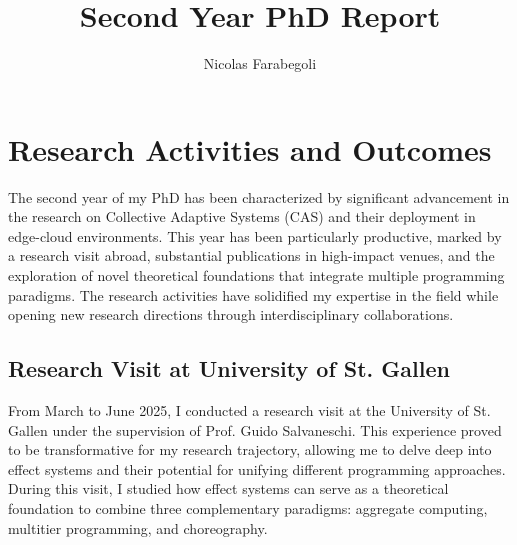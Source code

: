 \documentclass[runningheads]{llncs}
\begin{document}
%
\title{Second Year PhD Report}
%
%
\author{Nicolas Farabegoli}%
%
%
%
\maketitle              %
%

%
%
%
\section{Research Activities and Outcomes}
The second year of my PhD has been characterized by significant advancement in the research on Collective Adaptive Systems (CAS) and their deployment in edge-cloud environments.
%
This year has been particularly productive,
marked by a research visit abroad,
substantial publications in high-impact venues,
and the exploration of novel theoretical foundations that integrate multiple programming paradigms.
%
The research activities have solidified my expertise in the field while opening new research directions through interdisciplinary collaborations.

\subsection{Research Visit at University of St. Gallen}

From March to June 2025,
I conducted a research visit at the University of St. Gallen under the supervision of Prof. Guido Salvaneschi.
%
This experience proved to be transformative for my research trajectory,
allowing me to delve deep into effect systems and their potential for unifying different programming approaches.
%
During this visit,
I studied how effect systems can serve as a theoretical foundation to combine three complementary paradigms:
aggregate computing,
multitier programming,
and choreography.
\end{document}
